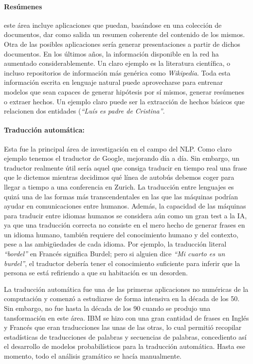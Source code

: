 \paragraph{Resúmenes} este área incluye aplicaciones que puedan, basándose en
una colección de documentos, dar como salida un resumen coherente del contenido
de los mismos. Otra de las posibles aplicaciones sería generar presentaciones a
partir de dichos documentos. En los últimos años, la información disponible en
la red ha aumentado considerablemente. Un claro ejemplo es la literatura
científica, o incluso repositorios de información más genérica como
\emph{Wikipedia}. Toda esta información escrita en lenguaje natural puede
aprovecharse para entrenar modelos que sean capaces de generar hipótesis por sí
mismos, generar resúmenes o extraer hechos. Un ejemplo claro puede ser la
extracción de hechos básicos que relacionen dos entidades (\emph{``Luís es padre
de Cristina''}.

\paragraph{Traducción automática:} Esta fue la principal área de investigación
en el campo del \ac{NLP}. Como claro ejemplo tenemos el traductor de Google,
mejorando día a día. Sin embargo, un traductor realmente útil sería aquel que
consiga traducir en tiempo real una frase que le dictemos mientras decidimos qué
línea de autobús debemos coger para llegar a tiempo a una conferencia en
Zurich. La traducción entre lenguajes es quizá una de las formas más
transcendentales en las que las máquinas podrían ayudar en comunicaciones entre
humanos. Además, la capacidad de las máquinas para traducir entre idiomas
humanos se considera aún como un gran test a la \ac{IA}, ya que una traducción
correcta no consiste en el mero hecho de generar frases en un idioma humano,
también requiere del conocimiento humano y del contexto, pese a las ambigüedades
de cada idioma. Por ejemplo, la traducción literal
%
\emph{``bordel''} en Francés significa Burdel; pero si alguien dice \emph{``Mi
  cuarto es un burdel''}, el traductor debería tener el conocimiento suficiente
para inferir que la persona se está refiriendo a que su habitación es un
desorden.

La traducción automática fue una de las primeras aplicaciones no numéricas de la
computación y comenzó a estudiarse de forma intensiva en la década de los
50. Sin embargo, no fue hasta la década de los 90 cuando se produjo una
tansformación en este área. IBM se hizo con una gran cantidad de frases en
Inglés y Francés que eran traducciones las unas de las otras,  lo cual permitió recopilar estadísticas de traducciones de
palabras y secuencias de palabras, concediento así el desarrollo de modelos
probabilísticos para la traducción automática. Hasta ese momento, todo el
análisis gramático se hacía manualmente.

